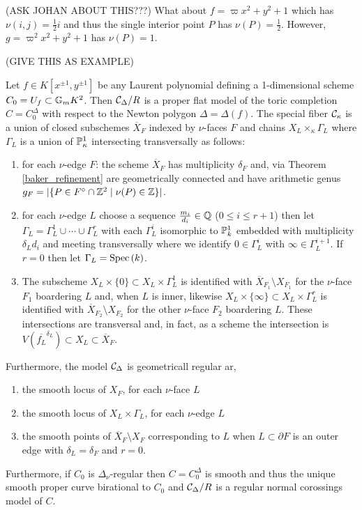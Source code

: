 \documentclass[12pt]{article}
\begin{document}
\begin{rmk}
(ASK JOHAN ABOUT THIS???)
What about $f = \varpi x^2 + y^2  + 1$ which has $\nu(i,j) = \tfrac{1}{2} i$ and thus the single interior point $P$ has $\nu(P) = \tfrac{1}{2}$. However, $g = \varpi^2 x^2 + y^2 + 1$ has $\nu(P) = 1$.
\end{rmk}

(GIVE THIS AS EXAMPLE)

\begin{theorem}[DK, Thm. 3.14]
Let $f \in K[x^{\pm 1}, y^{\pm 1}]$ be any Laurent polynomial defining a 1-dimensional scheme $C_0 = U_f \subset \Gm{K}^2$. Then $\C_\Delta / R$ is a proper flat model of the toric completion $C = C_0^\Delta$ with respect to the Newton polygon $\Delta = \Delta(f)$. The special fiber $\C_\kappa$ is a union of closed subschemes $\overline{X}_F$ indexed by $\nu$-faces $F$ and chains $X_L \times_\kappa \Gamma_L$ where $\Gamma_L$ is a union of $\P^1_{\kappa}$ intersecting transversally as follows:
\begin{enumerate}
\item for each $\nu$-edge $F$: the scheme $\overline{X}_F$ has multiplicity $\delta_F$ and, via Theorem \ref{baker_refinement} are geometrically connected and have arithmetic genus $ g_F = |\{ P \in F^\circ \cap \Z^2 \mid \nu(P) \in \Z \} | $.
\item for each $\nu$-edge $L$ choose a sequence $\frac{m_i}{d_i} \in \Q$ ($0 \le i \le r+1$) then let $\Gamma_L = \Gamma^1_L \cup \cdots \cup \Gamma^r_L$ with each $\Gamma^i_L$ isomorphic to $\P^1_k$ embedded with multiplicity $\delta_L d_i$ and meeting transversally where we identify $0 \in \Gamma^i_L$ with $\infty \in \Gamma^{i+1}_L$. If $r = 0$ then let $\Gamma_L = \Spec{k}$.
\item The subscheme $X_L \times \{ 0 \} \subset X_L \times \Gamma^1_L$ is identified with $\overline{X}_{F_1} \setminus X_{F_1}$ for the $\nu$-face $F_1$ boardering $L$ and, when $L$ is inner, likewise $X_L \times \{ \infty \} \subset X_L \times \Gamma^r_L$ is identified with $\overline{X}_{F_2} \setminus X_{F_2}$ for the other $\nu$-face $F_2$ boardering $L$. These intersections are transversal and, in fact, as a scheme the intersection is $V(\overline{f_L}^{\delta_L}) \subset X_L \subset \overline{X}_F$. 
\end{enumerate}
Furthermore, the model $\C_\Delta$ is geometricall regular ar,
\begin{enumerate}
\item the smooth locus of $X_F$, for each $\nu$-face $L$
\item the smooth locus of $X_L \times \Gamma_L$, for each $\nu$-edge $L$
\item the smooth points of $\overline{X}_F \setminus X_F$ corresponding to $L$ when $L \subset \partial F$ is an outer edge with $\delta_L = \delta_F$ and $r = 0$. 
\end{enumerate}
Furthermore, if $C_0$ is $\Delta_\nu$-regular then $C = C_0^\Delta$ is smooth and thus the unique smooth proper curve birational to $C_0$ and $\C_\Delta / R$ is a regular normal corossings model of $C$. 
\end{theorem}
\end{document}
